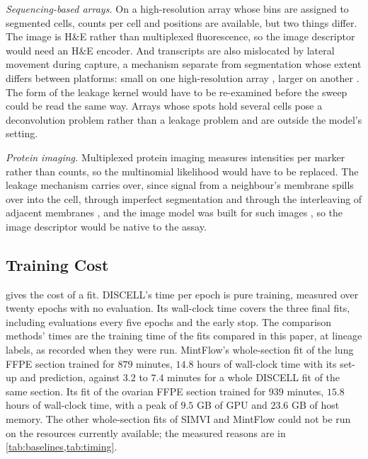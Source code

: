 \emph{Sequencing-based arrays.} On a high-resolution array whose bins are assigned to segmented cells, counts per cell and positions are available, but two things differ. The image is H\&E rather than multiplexed fluorescence, so the image descriptor would need an H\&E encoder. And transcripts are also mislocated by lateral movement during capture, a mechanism separate from segmentation whose extent differs between platforms: small on one high-resolution array \citep{deoliveira2025visiumhd}, larger on another \citep{ren2025benchmark}. The form of the leakage kernel would have to be re-examined before the sweep could be read the same way. Arrays whose spots hold several cells pose a deconvolution problem rather than a leakage problem and are outside the model's setting.

\emph{Protein imaging.} Multiplexed protein imaging measures intensities per marker rather than counts, so the multinomial likelihood would have to be replaced. The leakage mechanism carries over, since signal from a neighbour's membrane spills over into the cell, through imperfect segmentation and through the interleaving of adjacent membranes \citep{bai2021redsea}, and the image model was built for such images \citep{kronos2025}, so the image descriptor would be native to the assay.

\subsection{Training Cost}
\label{app:timing}

 gives the cost of a fit. DISCELL's time per epoch is pure training, measured over twenty epochs with no evaluation. Its wall-clock time covers the three final fits, including evaluations every five epochs and the early stop. The comparison methods' times are the training time of the fits compared in this paper, at lineage labels, as recorded when they were run. MintFlow's whole-section fit of the lung FFPE section trained for $879$ minutes, $14.8$ hours of wall-clock time with its set-up and prediction, against $3.2$ to $7.4$ minutes for a whole DISCELL fit of the same section. Its fit of the ovarian FFPE section trained for $939$ minutes, $15.8$ hours of wall-clock time, with a peak of $9.5$ GB of GPU and $23.6$ GB of host memory. The other whole-section fits of SIMVI and MintFlow could not be run on the resources currently available; the measured reasons are in \cref{tab:baselines,tab:timing}.

